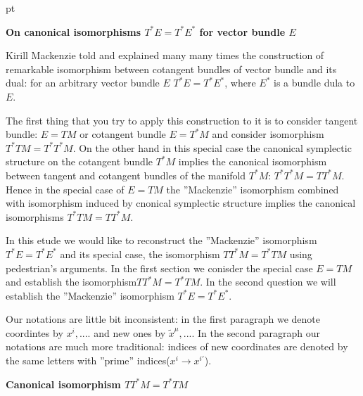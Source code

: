 
    pt

\def\V {{\cal V}}
\def\s {{\sigma}}
\def\Q {{\bf Q}}
\def\D {{\cal D}}
\def\G {{\Gamma}}
\def\C {{\bf C}}
\def\M {{\cal M}}
\def\Z {{\bf Z}}
\def\U  {{\cal U}}
\def\H {{\cal H}}
\def\R  {{\bf R}}
\def\l {\lambda}
\def\w {\omega}
\def\p {\partial}
\def\r {{\bf r}}
\def\v {{\bf v}}
\def\n {{\bf n}}
\def\t  {\tilde}
\def\b {{\bf b}}
\def\ac {{\bf a}}
\def \X   {{\bf X}}
\def \Y   {{\bf Y}}
\def \E   {{\bf E}}
\def \N   {{\bf N}}
\def \finish {${\,\,\vrule height1mm depth2mm width 8pt}$}

\centerline {\bf On canonical isomorphisms $T^*E=T^*E^*$ for vector bundle $E$}



  Kirill Mackenzie told and explained many many times the construction of
remarkable isomorphism between cotangent bundles of 
vector bundle and its dual: for an arbitrary vector bundle $E$
 $T^*E=T^*E^*$,
where $E^*$ is a bundle dula to $E$.

The first thing that you try to apply this construction to it is to consider
  tangent bundle: $E=TM$ or cotangent bundle $E=T^*M$ and consider  
  isomorphism $T^*TM=T^*T^*M$.
On the other hand in this special case
the canonical symplectic structure on the cotangent bundle $T^*M$ implies
the canonical isomorphism between tangent and cotangent bundles of
the manifold $T^*M$:
              $T^*T^*M=TT^*M$.
Hence in the special case of $E=TM$ the ''Mackenzie'' isomorphism 
combined with isomorphism  induced by cnonical symplectic structure 
implies the canonical isomorphisms $T^*TM=TT^*M$.

In this etude we would like to reconstruct 
the ''Mackenzie'' isomorphism $T^*E=T^*E^*$ 
and its special case, the isomorphism
  $TT^*M=T^*TM$ using pedestrian's arguments.  
 In the first section we conisder the special case
$E=TM$ and establish the isomorphism$TT^*M=T^*TM$.
In the second question we will establish  
the ''Mackenzie'' isomorphism $T^*E=T^*E^*$.

Our notations are little bit inconsistent: in the first paragraph we
denote coordintes by $x^i,....$ and new ones by
 $\tilde x^\mu,...$.
  In the second paragraph our notations are much more traditional:
indices of new coordinates are denoted by the same letters with ''prime'' indices($x^i\to x^{i'}$). 

\medskip

\centerline{ \bf Canonical isomorphism $TT^*M=T^*TM$}

